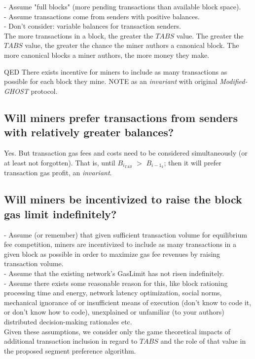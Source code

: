 \documentclass[11pt]{article}
\theoremstyle{plain}
\newcommand{\mghost}{\textit{Modified-GHOST }}
\begin{document}
{- Assume "full blocks" (more pending transactions than available block space).
\\
- Assume transactions come from senders with positive balances. \\
- Don't consider: variable balances for transaction senders. \\

The more transactions in a block, the greater the $TABS$ value.
The greater the $TABS$ value, the greater the chance the miner authors a
canonical block.
The more canonical blocks a miner authors, the more money they make.

QED There exists incentive for miners to include as many transactions as
possible for each block they mine.
NOTE as an \textit{invariant} with original \mghost protocol.

\subsection{\small{Will miners prefer transactions from senders with relatively
greater balances?}}

Yes. But transaction gas fees and costs need to be considered simultaneously
(or at least not forgotten).
That is, until $B_{i}_{TAB}$ $>$ $B_{i-1}_{k}$; then it will prefer transaction
gas profit, an \textit{invariant}.

\subsection{\small{Will miners be incentivized to raise the block gas limit
indefinitely?}}

- Assume (or remember) that given sufficient transaction volume for equilibrium
fee competition, miners
  are incentivized to include as many transactions in a given block as possible
in order to maximize
  gas fee revenues by raising transaction volume. \\
- Assume that the existing network's GasLimit has not risen indefinitely. \\
- Assume there exists some reasonable reason for this, like block rationing
processing time and energy,
  network latency optimization, social norms, mechanical ignorance of or
insufficient means of execution (don't know to code it, or don't know how to
code),
  unexplained or unfamiliar (to your authors) distributed decision-making
rationales etc. \\

Given these assumptions, we consider only the game theoretical impacts of
additional transaction inclusion
in regard to $TABS$ and the role of that value in the proposed segment
preference algorithm.

}
\end{document}
